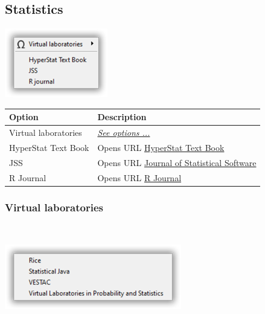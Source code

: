 \hypertarget{menu_web_statistics}{}
\subsection{Statistics}

\includegraphics[scale=0.50]{./res/menu_web_statistics.png}\\

\begin{scriptsize}
  \begin{tabularx}{\textwidth}{>{\hsize=0.5\hsize}X>{\hsize=0.7\hsize}X}\\
    \hline
    \textbf{Option} & \textbf{Description} \\
    \hline
    Virtual laboratories & \textit{\href{\#menu\_web\_statistics\_virtuallabs}{See options ...}} \\
    HyperStat Text Book & Opens URL \href{http://davidmlane.com/hyperstat/index.html}{HyperStat Text Book} \\
    JSS & Opens URL \href{http://www.jstatsoft.org/}{Journal of Statistical Software} \\
    R Journal & Opens URL \href{http://journal.r-project.org}{R Journal} \\
    \hline
  \end{tabularx}
\end{scriptsize}


\hypertarget{menu_web_statistics_virtuallabs}{}
\subsubsection{Virtual laboratories}\\

\includegraphics[scale=0.50]{./res/menu_web_statistics_virtuallabs.png}\\

